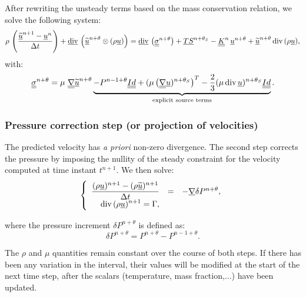 After rewriting the unsteady terms based on the mass conservation relation,
we solve the following system:
\begin{equation}
\displaystyle
\rho\,\left(\dfrac{\underline{\widetilde{u}}^{n+1}-\underline{u}^{n}}{\Delta t}\right) +
\underline{\text{div}}\, \left(\underline{\widetilde{u}}^{n+\theta} \otimes (\rho\underline{u}) \right) =
\underline{\text{div}}\, \left(\underline{\underline{\sigma}}^{n+\theta}\right) + \underline{TS}^{n+\theta_{S}}-\underline{\underline{K}}^{n}\,\underline{u}^{n+\theta} +\underline{\widetilde{u}}^{n+\theta}\,\text{div}\,{(\rho\underline{u})} ,
\label{eq:navstv:c0_prediction_step}
\end{equation}
with:
\begin{equation}
\displaystyle
\underline{\underline{\sigma}}^{n+\theta}=\mu\,\,\underline{\underline{\nabla}}\underline{\widetilde{u}}^{n+\theta}\underbrace{-P^{n-1+\theta}\underline{\underline{Id}}+ (\mu \left(\underline{\underline{\nabla}}\underline{u})^{n+\theta_{S}}\right)^T- \frac{2}{3} ( \mu\, \text{div}\, \underline{u})^{n+\theta_{S}}\underline{\underline{Id}}}_{\text{explicit source terms}}.
\end{equation}

\subsubsection*{\bf Pressure correction step (or projection of velocities)}
The predicted velocity has \emph{a priori} non-zero divergence. The second step
corrects the pressure by imposing the nullity of the steady constraint for
the velocity computed at time instant ${t^{n+1}}$.
We then solve:
\begin{equation}\label{eq:navstv:c0_correction_step}
\left\{\begin{array}{ r c l}
\displaystyle \dfrac{(\rho\underline{u})^{n+1}-(\rho\underline{\widetilde{u}})^{n+1}}{\Delta t} &=&
-\underline{\nabla}{\delta P^{n+\theta}} ,\\
\displaystyle
\text{div}\,(\rho\underline{u})^{n+1} = \Gamma ,\\
\end{array}\right.
\end{equation}

where the pressure increment $\delta P^{n+\theta}$ is defined as:
\begin{equation}
\delta P^{n+\theta}=P^{n+\theta}-P^{n-1+\theta} .
\end{equation}

\begin{remark}
The  $\rho$ and $\mu$ quantities remain constant over the course of both
steps. If there has been any variation in the interval, their values will be modified at the start of the next time step, after the scalars (temperature, mass fraction,...) have been updated.
\end{remark}

